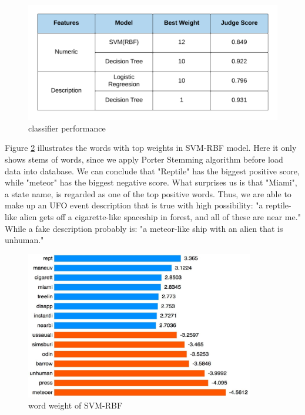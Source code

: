 \begin{figure}[H]
    \centering
    \includegraphics[width=12cm]{figure/classifier_score.png}
    \caption{classifier performance}
    \label{classifier}
\end{figure}


Figure \ref{word_weight} illustrates the words with top weights in SVM-RBF model. Here it only shows stems of words, since we apply Porter Stemming algorithm before load data into database. We can conclude that "Reptile" has the biggest positive score, while "meteor" has the biggest negative score. What surprises us is that "Miami", a state name, is regarded as one of the top positive words. Thus, we are able to make up an UFO event description that is true with high possibility: "a reptile-like alien gets off a cigarette-like spaceship in forest, and all of these are near me." While a fake description probably is: "a meteor-like ship with an alien that is unhuman."
\begin{figure}[H]
    \centering
    \includegraphics[width=10cm]{figure/word_weight.png}
    \caption{word weight of SVM-RBF}
    \label{word_weight}
\end{figure}

